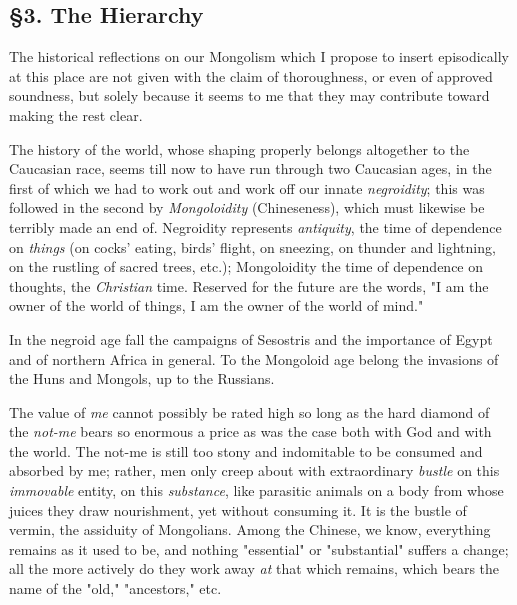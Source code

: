 \documentclass[a4paper]{book}
\begin{document}
\medskip{}

\subsection[\S{}3. The Hierarchy]{\centering \S{}3. The Hierarchy}

The historical reflections on our Mongolism which I propose to insert 
episodically at this place are not given with the claim of thoroughness, or 
even of approved soundness, but solely because it seems to me that they may 
contribute toward making the rest clear.

The history of the world, whose shaping properly belongs altogether to the 
Caucasian race, seems till now to have run through two Caucasian ages, in the 
first of which we had to work out and work off our innate \textit{negroidity}; 
this was followed in the second by \textit{Mongoloidity} (Chineseness), which 
must likewise be terribly made an end of. Negroidity represents 
\textit{antiquity}, the time of dependence on \textit{things} (on cocks' 
eating, birds' flight, on sneezing, on thunder and lightning, on the rustling 
of sacred trees, etc.); Mongoloidity the time of dependence on thoughts, the 
\textit{Christian} time. Reserved for the future are the words, "{}I am the 
owner of the world of things, I am the owner of the world of mind."{}

In the negroid age fall the campaigns of Sesostris and the importance of Egypt 
and of northern Africa in general. To the Mongoloid age belong the invasions 
of the Huns and Mongols, up to the Russians.

The value of \textit{me} cannot possibly be rated high so long as the hard 
diamond of the \textit{not-me} bears so enormous a price as was the case both 
with God and with the world. The not-me is still too stony and indomitable to 
be consumed and absorbed by me; rather, men only creep about with 
extraordinary \textit{bustle} on this \textit{immovable} entity, on this 
\textit{substance}, like parasitic animals on a body from whose juices they 
draw nourishment, yet without consuming it. It is the bustle of vermin, the 
assiduity of Mongolians. Among the Chinese, we know, everything remains as it 
used to be, and nothing "{}essential"{} or "{}substantial"{} suffers a change; 
all the more actively do they work away \textit{at} that which remains, which 
bears the name of the "{}old,"{} "{}ancestors,"{} etc.
\end{document}
